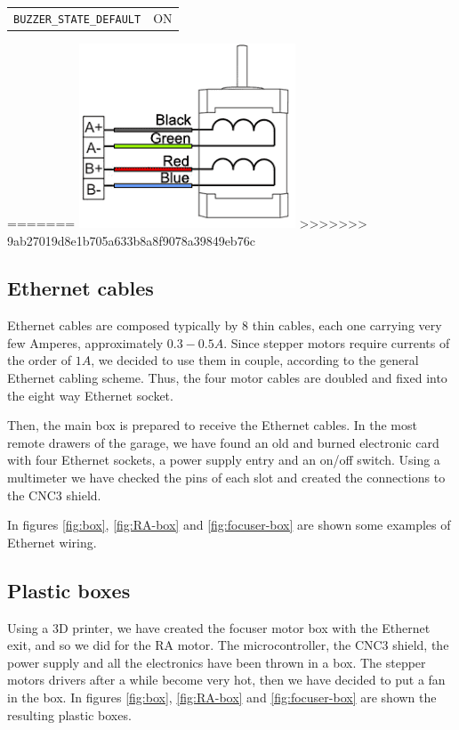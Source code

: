 \documentclass{article}
\begin{document}
\begin{multicols}{2}
\begin{minipage}
\begin{tabular}{cc}
                \texttt{BUZZER\_STATE\_DEFAULT} & ON\\
            \end{tabular}
            \label{fig:config_h}
=======
            \includegraphics[scale=0.5]{stepper-motors-cables.png}
            \label{fig:stepper-motors-cables}
>>>>>>> 9ab27019d8e1b705a633b8a8f9078a39849eb76c
        \end{minipage}

        \subsection{Ethernet cables}
        Ethernet cables are composed typically by 8 thin cables, each one carrying very few Amperes, approximately \(0.3-0.5A\).
        Since stepper motors require currents of the order of \(1A\), we decided to use them in couple, according to the general Ethernet cabling scheme.
        Thus, the four motor cables are doubled and fixed into the eight way Ethernet socket.

        Then, the main box is prepared to receive the Ethernet cables.
        In the most remote drawers of the garage, we have found an old and burned electronic card with four Ethernet sockets, a power supply entry and an on/off switch.
        Using a multimeter we have checked the pins of each slot and created the connections to the CNC3 shield.

        In figures \ref{fig:box}, \ref{fig:RA-box} and \ref{fig:focuser-box} are shown some examples of Ethernet wiring.

        \subsection{Plastic boxes}
        Using a 3D printer, we have created the focuser motor box with the Ethernet exit, and so we did for the RA motor.
        The microcontroller, the CNC3 shield, the power supply and all the electronics have been thrown in a box.
        The stepper motors drivers after a while become very hot, then we have decided to put a fan in the box.
        In figures \ref{fig:box}, \ref{fig:RA-box} and \ref{fig:focuser-box} are shown the resulting plastic boxes.


\end{multicols}
\end{document}
